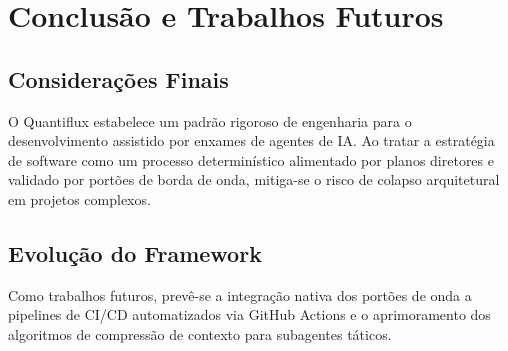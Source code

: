\chapter{Conclusão e Trabalhos Futuros}

\section{Considerações Finais}
O Quantiflux estabelece um padrão rigoroso de engenharia para o desenvolvimento assistido por enxames de agentes de IA. Ao tratar a estratégia de software como um processo determinístico alimentado por planos diretores e validado por portões de borda de onda, mitiga-se o risco de colapso arquitetural em projetos complexos.

\section{Evolução do Framework}
Como trabalhos futuros, prevê-se a integração nativa dos portões de onda a pipelines de CI/CD automatizados via GitHub Actions e o aprimoramento dos algoritmos de compressão de contexto para subagentes táticos.